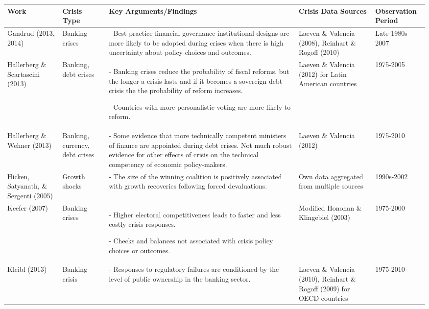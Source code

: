 \begin{tabular}{ m{2.5cm} m{1.75cm} m{6.25cm} m{2.5cm} m{1.75cm}}
    \hline
    Work & Crisis Type & Key Arguments/Findings & Crisis Data Sources & Observation Period \\
    \hline\hline

    Gandrud (2013, 2014) & Banking crises & - Best practice financial governance institutional designs are more likely to be adopted during crises when there is high uncertainty about policy choices and outcomes. & Laeven \& Valencia (2008), Reinhart \& Rogoff (2010) & Late 1980s-2007 \\[0.25cm]\hline

    Hallerberg \& Scartascini (2013) & Banking, debt crises & - Banking crises reduce the probability of fiscal reforms, but the longer a crisis lasts and if it becomes a sovereign debt crisis the the probability of reform increases.

    - Countries with more personalistic voting are more likely to reform. & Laeven \& Valencia (2012) for Latin American countries & 1975-2005 \\[0.25cm]\hline

    Hallerberg \& Wehner (2013) & Banking, currency, debt crises & - Some evidence that more technically competent ministers of finance are appointed during debt crises. Not much robust evidence for other effects of crisis on the technical competency of economic policy-makers. & Laeven \& Valencia (2012) & 1975-2010 \\[0.25cm]\hline

    Hicken, Satyanath, \& Sergenti (2005) & Growth shocks & - The size of the winning coalition is positively associated with growth recoveries following forced devaluations. & Own data aggregated from multiple sources & 1990s-2002 \\[0.25cm]\hline

    Keefer (2007) & Banking crises & - Higher electoral competitiveness leads to faster and less costly crisis responses.

    - Checks and balances not associated with crisis policy choices or outcomes. & Modified Honohan \& Klingebiel (2003) & 1975-2000 \\[0.25cm]\hline

    Kleibl (2013) & Banking crisis & - Responses to regulatory failures are conditioned by the level of public ownership in the banking sector. & Laeven \& Valencia (2010), Reinhart \& Rogoff (2009) for OECD countries & 1975-2010 \\[0.25cm]\hline


\end{tabular}
